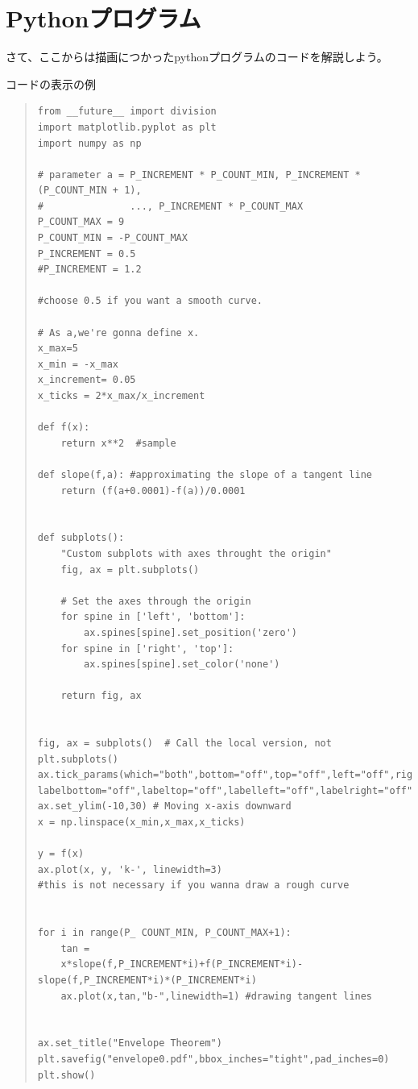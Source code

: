 \documentclass[11pt,a4j,fleqn]{jarticle}
\begin{document}
\section{Pythonプログラム}

さて、ここからは描画につかったpythonプログラムのコードを解説しよう。

コードの表示の例
\begin{quote}
\begin{verbatim}
from __future__ import division
import matplotlib.pyplot as plt
import numpy as np

# parameter a = P_INCREMENT * P_COUNT_MIN, P_INCREMENT * (P_COUNT_MIN + 1),
#               ..., P_INCREMENT * P_COUNT_MAX
P_COUNT_MAX = 9
P_COUNT_MIN = -P_COUNT_MAX
P_INCREMENT = 0.5
#P_INCREMENT = 1.2

#choose 0.5 if you want a smooth curve.

# As a,we're gonna define x. 
x_max=5
x_min = -x_max
x_increment= 0.05
x_ticks = 2*x_max/x_increment

def f(x):
	return x**2  #sample

def slope(f,a): #approximating the slope of a tangent line
	return (f(a+0.0001)-f(a))/0.0001


def subplots():
    "Custom subplots with axes throught the origin"
    fig, ax = plt.subplots()

    # Set the axes through the origin
    for spine in ['left', 'bottom']:
        ax.spines[spine].set_position('zero')
    for spine in ['right', 'top']:
        ax.spines[spine].set_color('none')

    return fig, ax


fig, ax = subplots()  # Call the local version, not plt.subplots()
ax.tick_params(which="both",bottom="off",top="off",left="off",right="off",
labelbottom="off",labeltop="off",labelleft="off",labelright="off")
ax.set_ylim(-10,30) # Moving x-axis downward 
x = np.linspace(x_min,x_max,x_ticks)

y = f(x)
ax.plot(x, y, 'k-', linewidth=3)
#this is not necessary if you wanna draw a rough curve


for i in range(P_ COUNT_MIN, P_COUNT_MAX+1):
	tan = 
	x*slope(f,P_INCREMENT*i)+f(P_INCREMENT*i)-slope(f,P_INCREMENT*i)*(P_INCREMENT*i)
	ax.plot(x,tan,"b-",linewidth=1) #drawing tangent lines


ax.set_title("Envelope Theorem")
plt.savefig("envelope0.pdf",bbox_inches="tight",pad_inches=0)
plt.show()
\end{verbatim}
\end{quote}
\end{document}

